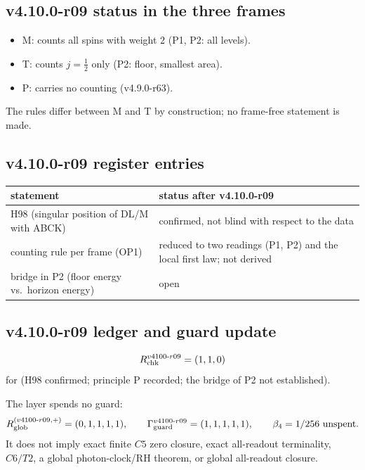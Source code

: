 \subsection*{v4.10.0-r09 status in the three frames}
\label{subsec:v4100-r09-frames}

\begin{itemize}[leftmargin=2em]
\item M: counts all spins with weight \(2\) (P1, P2: all levels).
\item T: counts \(j=\tfrac12\) only (P2: floor, smallest area).
\item P: carries no counting (v4.9.0-r63).
\end{itemize}
The rules differ between M and T by construction; no frame-free statement is made.

\subsection*{v4.10.0-r09 register entries}
\label{subsec:v4100-r09-register}

\begin{center}
\small
\begin{tabular}{@{}>{\raggedright\arraybackslash}p{}>{\raggedright\arraybackslash}p{}@{}}
\toprule
statement & status after v4.10.0-r09\\
\midrule
H98 (singular position of DL/M with ABCK) & confirmed, not blind with respect to the data\\
counting rule per frame (OP1) & reduced to two readings (P1, P2) and the local first law; not derived\\
bridge in P2 (floor energy vs.\ horizon energy) & open\\
\bottomrule
\end{tabular}
\end{center}

\subsection*{v4.10.0-r09 ledger and guard update}
\label{subsec:v4100-r09-ledger-guard}

\[
R_{\rm chk}^{v4100\text{-}r09}=(1,1,0)
\]
for (H98 confirmed; principle P recorded; the bridge of P2 not established).

The layer spends no guard:
\[
R_{\rm glob}^{(v4100\text{-}r09,+)}=(0,1,1,1,1),
\qquad
\Gamma_{\rm guard}^{v4100\text{-}r09}=(1,1,1,1,1),
\qquad
\beta_4=1/256\ \text{unspent}.
\]
It does not imply exact finite \(C5\) zero closure, exact all-readout terminality,
\(C6/T2\), a global photon-clock/RH theorem, or global all-readout closure.
